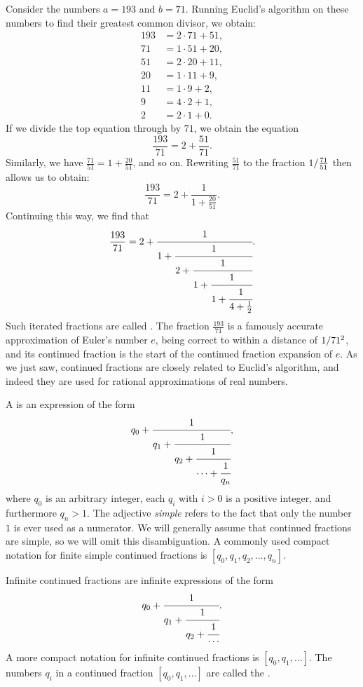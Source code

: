 Consider the numbers $a=193$ and $b=71$. Running Euclid's algorithm on these numbers to find their greatest common divisor, we obtain:
\begin{align*}
  193 & = 2\cdot 71 + 51, \\
  71 & = 1\cdot 51 + 20, \\
  51 & = 2\cdot 20 + 11, \\
  20 & = 1\cdot 11 + 9, \\
  11 & = 1\cdot 9 + 2, \\
  9 & = 4\cdot 2 + 1, \\
  2 & = 2\cdot 1 + 0.
\end{align*}
If we divide the top equation through by $71$, we obtain the equation
\begin{equation*}
  \frac{193}{71}=2+\frac{51}{71}.
\end{equation*}
Similarly, we have $\frac{71}{51}=1+\frac{20}{51}$, and so on. Rewriting $\frac{51}{71}$ to the fraction $1/\frac{71}{51}$ then allows us to obtain:
\begin{equation*}
  \frac{193}{71}=2+\frac{1}{1+\frac{20}{51}}.
\end{equation*}
Continuing this way, we find that
\begin{equation*}
  \frac{193}{71}=2+\cfrac{1}{1+\cfrac{1}{2+\cfrac{1}{1+\cfrac{1}{1+\cfrac{1}{4+\tfrac{1}{2}}}}}}.
\end{equation*}
Such iterated fractions are called . The fraction $\frac{193}{71}$ is a famously accurate approximation of Euler's number $e$, being correct to within a distance of $1/71^2$, and its continued fraction is the start of the continued fraction expansion of $e$. As we just saw, continued fractions are closely related to Euclid's algorithm, and indeed they are used for rational approximations of real numbers.

\begin{definition}
  A  is an expression of the form
  \begin{equation*}
    q_0+\cfrac{1}{q_1+\cfrac{1}{q_2+\cfrac{1}{\cdots + \cfrac{1}{q_n}}}},
  \end{equation*}
  where $q_0$ is an arbitrary integer, each $q_i$ with $i>0$ is a positive integer, and furthermore $q_n>1$. The adjective \emph{simple} refers to the fact that only the number $1$ is ever used as a numerator. We will generally assume that continued fractions are simple, so we will omit this disambiguation. A commonly used compact notation for finite simple continued fractions is $[q_0,q_1,q_2,\ldots,q_n]$.

  Infinite continued fractions are infinite expressions of the form
  \begin{equation*}
    q_0+\cfrac{1}{q_1+\cfrac{1}{q_2+\cfrac{1}{\cdots}}}.
  \end{equation*}
  A more compact notation for infinite continued fractions is $[q_0,q_1,\ldots]$. The numbers $q_i$ in a continued fraction $[q_0,q_1,\ldots]$ are called the .
\end{definition}

